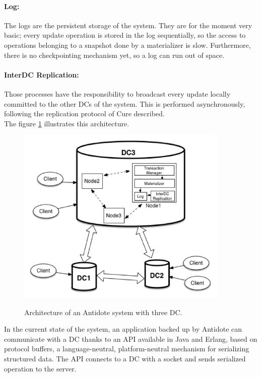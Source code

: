 \documentclass[11pt]{article}
\begin{document}
\paragraph{Log:}
The logs are the persistent storage of the system. They are
for the moment very basic; every update operation is stored in the
log sequentially, so the access to operations belonging to a snapshot
done by a materializer is slow. Furthermore, there is no checkpointing
mechanism yet, so a log can run out of space.

\paragraph{InterDC Replication:}
Those processes have the responsibility to broadcast every update locally
committed to the other DCs of the system. This is performed asynchronously,
following the replication protocol of Cure described.\\
The figure \ref{antidote} illustrates this architecture.

\begin{figure}[h]
	\caption{Architecture of an Antidote system with three DC.}
	\centering
	\includegraphics[width=0.9\textwidth]{figures/antidote_architecture}
	\label{antidote}
\end{figure}

In the current state of the system, an application backed up by Antidote can
communicate with a DC thanks to an API available in Java and Erlang, based on
protocol buffers, a language-neutral, platform-neutral mechanism for
serializing structured data. The API connects to a DC with a socket and sends
serialized operation to the server.
\end{document}
